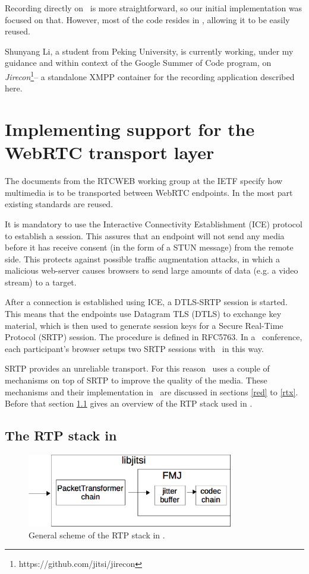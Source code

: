 \documentclass[twoside,openright,a4paper,12pt,english]{article}
\begin{document}
Recording directly on \jvb\ is more straightforward, so our initial
implementation was focused on that. However, most of the code resides in \lj, allowing
it to be easily reused.

Shunyang Li, a student from Peking University, is currently working, under my
guidance and within context of the Google Summer of Code program, on
\emph{Jirecon}\footnote{https://github.com/jitsi/jirecon}-- a standalone XMPP
container for the recording application described here.



\section{Implementing support for the WebRTC transport layer}
The documents from the RTCWEB working group at the IETF specify how multimedia
is to be transported between WebRTC endpoints. In the most part existing
standards are reused.

It is mandatory to use the Interactive Connectivity Establishment (ICE\cite{ice}) protocol to
establish a session. This assures that an endpoint will not send any media
before it has receive consent (in the form of a STUN message) from the remote
side. This protects against possible traffic augmentation attacks, in which a malicious
web-server causes browsers to send large amounts of data (e.g. a video stream) to a
target.

After a connection is established using ICE, a DTLS-SRTP session is started.
This means that the endpoints use Datagram TLS (DTLS\cite{dtls})
to exchange key material, which is then used to generate session keys for a
Secure Real-Time Protocol (SRTP\cite{srtp})
session. The procedure is defined in RFC5763\cite{rfc5763}.
In a \jm\ conference, each participant's browser setups two SRTP sessions with
\jvb\ in this way.

\medskip
SRTP provides an unreliable transport. For this reason \wrtc\ uses a couple of
mechanisms on top of SRTP to improve the quality of the media. These mechanisms
and their implementation in \lj\ are discussed in sections \ref{red} to
\ref{rtx}. Before that section \ref{lj} gives an overview of the RTP stack used
in \lj.


\subsection{The RTP stack in \lj}
\label{lj}

\begin{figure}
    \centering
    \includegraphics[width=9cm]{./pics/lj.eps}
    \caption{General scheme of the RTP stack in \lj.}
    \label{lj-scheme}
\end{figure}
\end{document}
